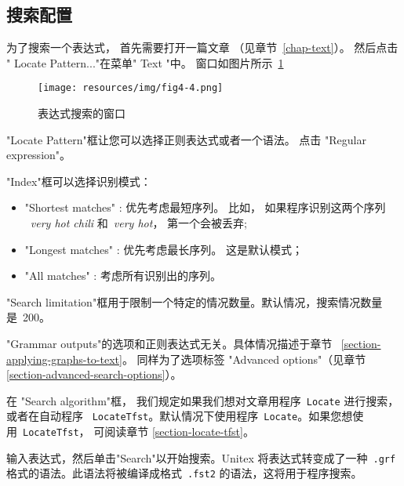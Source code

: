 \subsection{搜索配置}
\label{section-configuration-recherche}
为了搜索一个表达式， 首先需要打开一篇文章 （见章节~\ref{chap-text}）。 然后点击 "  Locate Pattern..."在菜单" Text "中。 窗口如图片所示~\ref{fig-regexp-search-configuration} 

\bigskip
\begin{figure}[h]
\begin{center}
\texttt{[image: resources/img/fig4-4.png]}
\caption{表达式搜索的窗口\label{fig-regexp-search-configuration}}
\end{center}
\end{figure}

\noindent "Locate Pattern"框让您可以选择正则表达式或者一个语法。 点击 "Regular expression"。


\bigskip
\noindent  "Index"框可以选择识别模式： 

\bigskip
{}
\begin{itemize}
  \item "Shortest matches" : 优先考虑最短序列。
  	  比如， 如果程序识别这两个序列 \ \textit{very hot chili} 和\ \textit{very hot}， 第一个会被丢弃;
  \item "Longest matches" : 优先考虑最长序列。 这是默认模式；
  \item "All matches" : 考虑所有识别出的序列。
\end{itemize}

\bigskip
\noindent  "Search limitation"框用于限制一个特定的情况数量。默认情况，搜索情况数量是\  200。

\bigskip
\noindent  "Grammar outputs"的选项和正则表达式无关。具体情况描述于章节 
~\ref{section-applying-graphs-to-text}。 同样为了选项标签
"Advanced options"（见章节\ref{section-advanced-search-options}）。

\bigskip
\noindent 在 "Search algorithm"框， 我们规定如果我们想对文章用程序\ \verb+Locate+ 进行搜索，或者在自动程序 \ \verb+LocateTfst+。默认情况下使用程序\ \verb+Locate+。如果您想使用\ \verb+LocateTfst+， 可阅读章节 \ref{section-locate-tfst}。

\bigskip
\noindent 输入表达式，然后单击"Search"以开始搜索。Unitex 将表达式转变成了一种\ \verb+.grf+ 格式的语法。此语法将被编译成格式\ \verb+.fst2+ 的语法，这将用于程序搜索。


